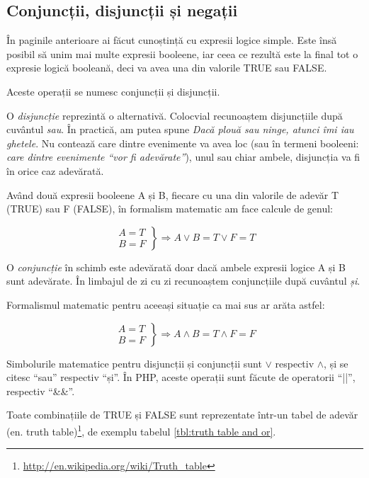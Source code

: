 \subsection{Conjuncții, disjuncții și negații}
În paginile anterioare ai făcut cunoștință cu expresii logice
simple. Este însă posibil să unim mai multe expresii booleene,
iar ceea ce rezultă este la final tot o expresie logică booleană,
deci va avea una din valorile TRUE sau FALSE.

Aceste operații se numesc conjuncții și disjuncții.

O \textsl{disjuncție}
reprezintă o alternativă. Colocvial recunoaștem disjuncțiile
după cuvântul \textit{sau}. În practică, am putea spune
\textit{Dacă plouă sau ninge, atunci îmi iau ghetele}. Nu contează
care dintre evenimente va avea loc (sau în termeni booleeni: \textit{care dintre
evenimente ``vor fi adevărate''}), unul sau chiar ambele, disjuncția
va fi în orice caz adevărată.

Având două expresii booleene A și B, fiecare cu una din valorile de
adevăr T (TRUE) sau F (FALSE), în formalism matematic am face calcule de genul:

\[ 
  \left.
  \begin{array}{c}
    A = T\\
    B = F
  \end{array}
  \right\}
  \Rightarrow A \lor B = T \lor F = T
\]

O \textsl{conjuncție} în schimb este adevărată doar dacă ambele expresii logice A și B
sunt adevărate. În limbajul de zi cu zi recunoaștem conjuncțiile după cuvântul \textit{și}.

Formalismul matematic pentru aceeași situație ca mai sus ar arăta astfel:

\[ 
  \left.
  \begin{array}{c}
    A = T\\
    B = F
  \end{array}
  \right\}
  \Rightarrow A \land B = T \land F = F
\]

Simbolurile matematice pentru disjuncții și conjuncții sunt $\lor$ respectiv $\land$, și se citesc
``sau'' respectiv ``și''. În PHP, aceste operații sunt făcute de operatorii ``||'', respectiv ``\&\&''.

Toate combinațiile de TRUE și FALSE sunt reprezentate într-un tabel de
adevăr (en. truth
table)\footnote{\url{http://en.wikipedia.org/wiki/Truth_table}}, de exemplu
tabelul \ref{tbl:truth table and or}.

